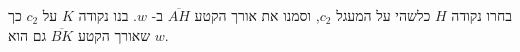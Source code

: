%
%


בחרו נקודה
$H$
כלשהי על המעגל
$c_2$,
וסמנו את אורך הקטע
$\overline{AH}$
ב-%
$w$.
בנו נקודה
$K$
על 
$c_2$
כך שאורך הקטע
$\overline{BK}$
גם הוא
$w$.

